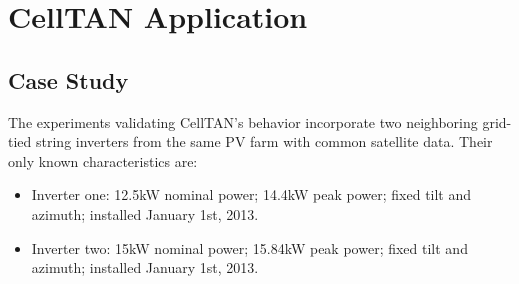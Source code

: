 \chapter{CellTAN Application} \label{chap:chap5}


\section{Case Study} \label{sec:case_study}


The experiments validating CellTAN's behavior incorporate two neighboring grid-tied string inverters from the same PV farm with common satellite data. Their only known characteristics are:

\begin{itemize}
    \item Inverter one: 12.5kW nominal power; 14.4kW peak power; fixed tilt and azimuth; installed January 1st, 2013.
    \item Inverter two: 15kW nominal power; 15.84kW peak power; fixed tilt and azimuth; installed January 1st, 2013.
\end{itemize}

